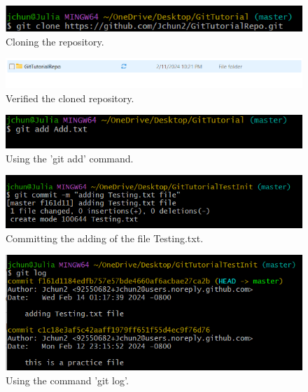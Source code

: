 \documentclass[10pt,twocolumn]{article}
\begin{document}
\begin{figure}
    \centering
    \includegraphics[width=.95\linewidth]{Git CLoinging.png}
    \caption{
        Cloning the repository.  
    }
    \label{Figure 4}
\end{figure}
\begin{figure}
    \centering
    \includegraphics[width=.95\linewidth]{clonedfile.png}
    \caption{
        Verified the cloned repository.  
    }
    \label{Figure 5}
\end{figure}
\begin{figure}
    \centering
    \includegraphics[width=.95\linewidth]{Gitadd.png}
    \caption{
      Using the 'git add' command. 
    }
    \label{Figure 6}
\end{figure}
\begin{figure}
    \centering
    \includegraphics[width=.95\linewidth]{GitcommitaddingTesting.png}
    \caption{
        Committing the adding of the file Testing.txt.   
    }
    \label{Figure 7}
\end{figure}
\begin{figure}
    \centering
    \includegraphics[width=.95\linewidth]{gitlog.png}
    \caption{
        Using the command 'git log'.    
    }
    \label{Figure 8}
\end{figure}
\end{document}
